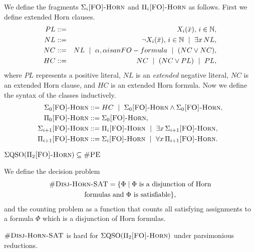 We define the fragments $\Sigma_{i}\textsc{[FO]-Horn}$ and $\Pi_{i}\textsc{[FO]-Horn}$ as follows. First we define extended Horn clauses.
\begin{eqnarray*}
	PL &::=& X_i(\bar{x}),\, i\in\mathbb{N},\\
	NL &::=& \neg X_i(\bar{x}),\, i\in\mathbb{N} \ \mid \ \exists x\, NL,\\
	NC &::=& NL \ \mid \ \alpha, \alpha \relax{ is an {\sc FO}-formula} \ \mid \ (NC \vee NC),\\
	HC &::=& NC \ \mid \ (NC \vee PL) \ \mid \ PL,
\end{eqnarray*}
where $PL$ represents a positive literal, $NL$ is an \textit{extended} negative literal, $NC$ is an extended Horn clause, and $HC$ is an extended Horn formula. Now we define the syntax of the classes inductively.
\begin{align*}
\Sigma_{0}\textsc{[FO]-Horn} &::= HC \ \mid \ \Sigma_{0}\textsc{[FO]-Horn} \wedge \Sigma_{0}\textsc{[FO]-Horn}, \\
\Pi_{0}\textsc{[FO]-Horn} &::= \Sigma_{0}\textsc{[FO]-Horn}, \\ 
\Sigma_{i+1}\textsc{[FO]-Horn} &::= \Pi_{i}\textsc{[FO]-Horn} \ \mid \ \exists x\, \Sigma_{i+1}\textsc{[FO]-Horn}, \\
\Pi_{i+1}\textsc{[FO]-Horn} &::= \Sigma_{i}\textsc{[FO]-Horn} \ \mid \ \forall x\, \Pi_{i+1}\textsc{[FO]-Horn}.
\end{align*}
\begin{theorem} \label{sigma2-pe}
	$\Sigma{\rm QSO}(\Pi_{2}\textsc{[FO]-Horn}) \subseteq \text{\sc \#PE}$
\end{theorem}

We define the decision problem
\begin{multline*}
\textsc{\#Disj-Horn-SAT} = \{\Phi \mid \Phi \text{ is a disjunction of Horn} \\ \text{formulas and $\Phi$ is satisfiable}\},
\end{multline*}
and the counting problem {\shdhsat } as a function that counts all satisfying assignments to a formula $\Phi$ which is a disjunction of Horn formulas.

\begin{theorem} \label{sigma2hard}
	$\textsc{\#Disj-Horn-SAT}$ is hard for $\Sigma{\rm QSO}(\Pi_{2}\textsc{[FO]-Horn})$ under parsimonious reductions. 
\end{theorem}